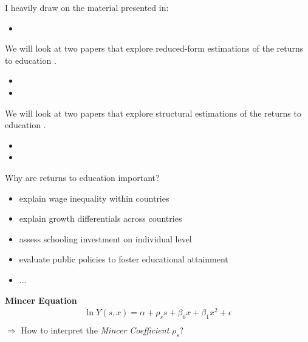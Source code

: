 
 \begin{frame}

 I heavily draw on the material presented in:

\begin{itemize}
\item {}
\end{itemize}

\end{frame}


 \begin{frame}
We will look at two papers that explore reduced-form estimations of the returns to education
.
\begin{itemize}
\item {}
\item {}
\end{itemize}
 \end{frame}

 \begin{frame}
We will look at two papers that explore structural estimations of the returns to education
.
\begin{itemize}
\item {}
\item {}
\end{itemize}
 \end{frame}


\begin{frame}
Why are returns to education important?
\begin{itemize}
\item explain wage inequality within countries
\item explain growth differentials across countries
\item assess schooling investment on individual level
\item evaluate public policies to foster educational attainment
\item ...
\end{itemize}
\end{frame}

\begin{frame}\nocite{Mincer.1958,Mincer.1974}
\textbf{Mincer Equation}\\
\begin{align*}
\ln{Y(s, x)} = \alpha + \rho_s s + \beta_0 x + \beta_1 x^2 + \epsilon\\
\end{align*}
$\Rightarrow$ How to interpret the \textit{Mincer Coefficient} $\rho_s$?
\end{frame}




